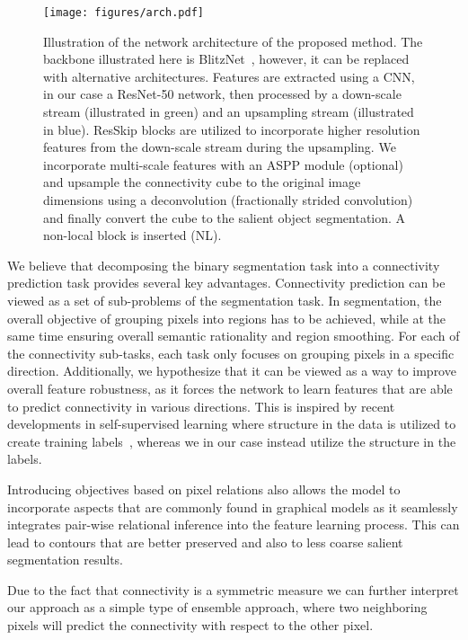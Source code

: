 \documentclass[journal]{IEEEtran}
\begin{document}
 \begin{figure*}[t]
\begin{center}
\texttt{[image: figures/arch.pdf]}
\end{center}
   \caption{Illustration of the network architecture of the proposed method. The backbone illustrated here is BlitzNet~\cite{dvornik2017blitznet}, however, it can be replaced with alternative architectures. Features are extracted using a CNN, in our case a ResNet-50 network, then processed by a down-scale stream (illustrated in green) and an upsampling stream (illustrated in blue). ResSkip blocks are utilized to incorporate higher resolution features from the down-scale stream during the upsampling. We incorporate multi-scale features with an ASPP module (optional) and upsample the connectivity cube to the original image dimensions using a deconvolution (fractionally strided convolution) and finally convert the cube to the salient object segmentation. A non-local block is inserted (NL).}
\label{fig:arch}
\end{figure*}

We believe that decomposing the binary segmentation task into a connectivity prediction task provides several key advantages. Connectivity prediction can be viewed as a set of sub-problems of the segmentation task. In segmentation, the overall objective of grouping pixels into regions has to be achieved, while at the same time ensuring overall semantic rationality and region smoothing. For each of the connectivity sub-tasks, each task only focuses on grouping pixels in a specific direction. Additionally, we hypothesize that it can be viewed as a way to improve overall feature robustness, as it forces the network to learn features that are able to predict connectivity in various directions. This is inspired by recent developments in self-supervised learning where structure in the data is utilized to create training labels~\cite{doersch2015unsupervised}, whereas we in our case instead utilize the structure in the labels.

Introducing objectives based on pixel relations also allows the model to incorporate aspects that are commonly found in graphical models as it seamlessly integrates pair-wise relational inference into the feature learning process. This can lead to contours that are better preserved and also to less coarse salient segmentation results.

Due to the fact that connectivity is a symmetric measure we can further interpret our approach as a simple type of ensemble approach, where two neighboring pixels will predict the connectivity with respect to the other pixel. 
\end{document}
